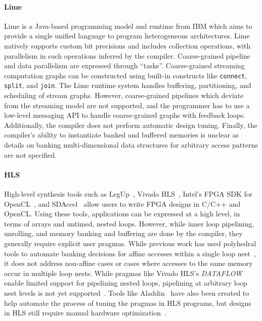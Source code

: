 \paragraph{Lime}
Lime is a Java-based programming model and runtime from IBM which aims to provide a single unified language to program heterogeneous architectures. Lime natively supports custom bit precisions and includes collection operations, with parallelism in such operations inferred by the compiler. Coarse-grained pipeline and data parallelism are expressed through ``tasks''. Coarse-grained streaming computation graphs can be constructed using built-in constructs like \texttt{\small{connect}}, \texttt{\small{split}}, and \texttt{\small{join}}. The Lime runtime system handles buffering, partitioning, and scheduling of stream graphs. However, coarse-grained pipelines which deviate from the streaming model are not supported, and the programmer has to use a low-level messaging API to handle coarse-grained graphs with feedback loops. Additionally, the compiler does not perform automatic design tuning. Finally, the compiler's ability to instantiate banked and buffered memories is unclear as details on banking multi-dimensional data structures for arbitrary access patterns are not specified.


\paragraph{HLS}
High-level synthesis tools such as LegUp~\cite{legup}, Vivado HLS~\cite{vivadohls}, Intel's FPGA SDK for OpenCL~\cite{opencl_sdk}, and SDAccel~\cite{sdaccel} allow users to write FPGA designs in C/C++ and OpenCL.
Using these tools, applications can be expressed at a high level, in terms of arrays and untimed, nested loops.
However, while inner loop pipelining, unrolling, and memory banking and buffering are done by the compiler, they generally require explicit user pragmas.
While previous work has used polyhedral tools to automate banking decisions for affine accesses within a single loop nest~\cite{Wang_banking},
it does not address non-affine cases or cases where accesses to the same memory occur in multiple loop nests.
While pragmas like Vivado HLS's \emph{DATAFLOW} enable limited support for pipelining nested loops, pipelining at arbitrary loop nest levels is not yet supported~\cite{vivado_userguide}.
Tools like Aladdin~\cite{Aladdin} have also been created to help automate the process of tuning the pragmas in HLS programs, but designs in HLS still require manual hardware optimization~\cite{nane2016survey}.

